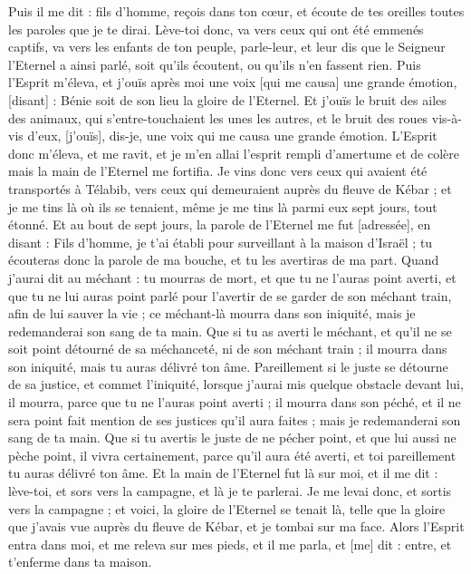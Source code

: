 \begin{multicols}{2}
Puis il me dit : fils d'homme, reçois dans ton cœur, et écoute de tes oreilles toutes les paroles que je te dirai.
Lève-toi donc, va vers ceux qui ont été emmenés captifs, va vers les enfants de ton peuple, parle-leur, et leur dis que le Seigneur l'Eternel a ainsi parlé, soit qu'ils écoutent, ou qu'ils n'en fassent rien.
Puis l'Esprit m'éleva, et j'ouïs après moi une voix [qui me causa] une grande émotion, [disant] : Bénie soit de son lieu la gloire de l'Eternel.
Et j'ouïs le bruit des ailes des animaux, qui s'entre-touchaient les unes les autres, et le bruit des roues vis-à-vis d'eux, [j'ouïs], dis-je, une voix qui me causa une grande émotion.
L'Esprit donc m'éleva, et me ravit, et je m'en allai l'esprit rempli d'amertume et de colère mais la main de l'Eternel me fortifia.
Je vins donc vers ceux qui avaient été transportés à Télabib, vers ceux qui demeuraient auprès du fleuve de Kébar ; et je me tins là où ils se tenaient, même je me tins là parmi eux sept jours, tout étonné.
Et au bout de sept jours, la parole de l'Eternel me fut [adressée], en disant :
Fils d'homme, je t'ai établi pour surveillant à la maison d'Israël ; tu écouteras donc la parole de ma bouche, et tu les avertiras de ma part.
Quand j'aurai dit au méchant : tu mourras de mort, et que tu ne l'auras point averti, et que tu ne lui auras point parlé pour l'avertir de se garder de son méchant train, afin de lui sauver la vie ; ce méchant-là mourra dans son iniquité, mais je redemanderai son sang de ta main.
Que si tu as averti le méchant, et qu'il ne se soit point détourné de sa méchanceté, ni de son méchant train ; il mourra dans son iniquité, mais tu auras délivré ton âme.
Pareillement si le juste se détourne de sa justice, et commet l'iniquité, lorsque j'aurai mis quelque obstacle devant lui, il mourra, parce que tu ne l'auras point averti ; il mourra dans son péché, et il ne sera point fait mention de ses justices qu'il aura faites ; mais je redemanderai son sang de ta main.
Que si tu avertis le juste de ne pécher point, et que lui aussi ne pèche point, il vivra certainement, parce qu'il aura été averti, et toi pareillement tu auras délivré ton âme.
Et la main de l'Eternel fut là sur moi, et il me dit : lève-toi, et sors vers la campagne, et là je te parlerai.
Je me levai donc, et sortis vers la campagne ; et voici, la gloire de l'Eternel se tenait là, telle que la gloire que j'avais vue auprès du fleuve de Kébar, et je tombai sur ma face.
Alors l'Esprit entra dans moi, et me releva sur mes pieds, et il me parla, et [me] dit : entre, et t'enferme dans ta maison.

\end{multicols}
